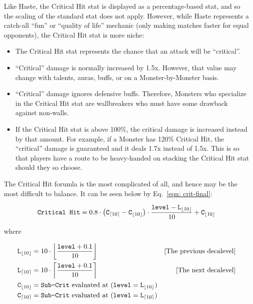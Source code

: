 






Like Haste, the Critical Hit stat is displayed as a percentage-based stat, and so the scaling of the standard stat does not apply. However, while Haste represents a catch-all ``fun'' or ``quality of life'' mechanic (only making matches faster for equal opponents), the Critical Hit stat is more niche:

\begin{itemize}
	\item{The Critical Hit stat represents the chance that an attack will be ``critical''.}
	\item{``Critical'' damage is normally increased by 1.5x. However, that value may change with talents, auras, buffs, or on a Monster-by-Monster basis.}
	\item{``Critical'' damage ignores defensive buffs. Therefore, Monsters who specialize in the Critical Hit stat are wallbreakers who must have some drawback against non-walls.}
	\item{If the Critical Hit stat is above 100\%, the critical damage is increased instead by that amount. For example, if a Monster has 120\% Critical Hit, the ``critical'' damage is guaranteed and it deals 1.7x instead of 1.5x. This is so that players have a route to be heavy-handed on stacking the Critical Hit stat should they so choose.}
\end{itemize}

The Critical Hit forumla is the most complicated of all, and hence may be the most difficult to balance. It can be seen below by Eq.~\eqref{eqn: crit-final}:

\begin{equation}\label{eqn: crit-final}
\texttt{Critical Hit} =  
		0.8 \cdot 
		\left(\texttt{C}_{\lceil10\rceil} - \texttt{C}_{\lfloor10\rfloor}\right) \cdot
		\frac{\texttt{level} - \texttt{L}_{\lfloor10\rfloor}}{10} +
		\texttt{C}_{\lfloor10\rfloor}
\end{equation}

\noindent where

\begin{align*}
	\texttt{L}_{\lfloor10\rfloor} &= 10\cdot \left\lfloor \frac{\texttt{level}+0.1}{10} \right\rfloor & \text{[The previous decalevel]} \\ 
	\texttt{L}_{\lceil10\rceil} &= 10\cdot \left\lceil \frac{\texttt{level}+0.1}{10} \right\rceil & \text{[The next decalevel]}\\
	\texttt{C}_{\lfloor10\rfloor} &= \texttt{Sub-Crit} \text{ evaluated at } (\texttt{level} = \texttt{L}_{\lfloor10\rfloor})\\
	\texttt{C}_{\lceil10\rceil} &= \texttt{Sub-Crit} \text{ evaluated at } (\texttt{level} = \texttt{L}_{\lceil10\rceil})
\end{align*}

